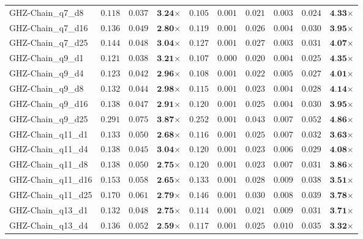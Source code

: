 \begin{table*}[t]
{\begin{tabular}{| l || r r c || r r r r r c |}
GHZ-Chain\_q7\_d8 & $0.118$ & $0.037$ & $\textbf{3.24}$$\times$ & $0.105$ & $0.001$ & $0.021$ & $0.003$ & $0.024$ & $\textbf{4.33}$$\times$ \\
GHZ-Chain\_q7\_d16 & $0.136$ & $0.049$ & $\textbf{2.80}$$\times$ & $0.119$ & $0.001$ & $0.026$ & $0.004$ & $0.030$ & $\textbf{3.95}$$\times$ \\
GHZ-Chain\_q7\_d25 & $0.144$ & $0.048$ & $\textbf{3.04}$$\times$ & $0.127$ & $0.001$ & $0.027$ & $0.003$ & $0.031$ & $\textbf{4.07}$$\times$ \\
GHZ-Chain\_q9\_d1 & $0.121$ & $0.038$ & $\textbf{3.21}$$\times$ & $0.107$ & $0.000$ & $0.020$ & $0.004$ & $0.025$ & $\textbf{4.35}$$\times$ \\
GHZ-Chain\_q9\_d4 & $0.123$ & $0.042$ & $\textbf{2.96}$$\times$ & $0.108$ & $0.001$ & $0.022$ & $0.005$ & $0.027$ & $\textbf{4.01}$$\times$ \\
GHZ-Chain\_q9\_d8 & $0.132$ & $0.044$ & $\textbf{2.98}$$\times$ & $0.115$ & $0.001$ & $0.023$ & $0.004$ & $0.028$ & $\textbf{4.14}$$\times$ \\
GHZ-Chain\_q9\_d16 & $0.138$ & $0.047$ & $\textbf{2.91}$$\times$ & $0.120$ & $0.001$ & $0.025$ & $0.004$ & $0.030$ & $\textbf{3.95}$$\times$ \\
GHZ-Chain\_q9\_d25 & $0.291$ & $0.075$ & $\textbf{3.87}$$\times$ & $0.252$ & $0.001$ & $0.043$ & $0.007$ & $0.052$ & $\textbf{4.86}$$\times$ \\
GHZ-Chain\_q11\_d1 & $0.133$ & $0.050$ & $\textbf{2.68}$$\times$ & $0.116$ & $0.001$ & $0.025$ & $0.007$ & $0.032$ & $\textbf{3.63}$$\times$ \\
GHZ-Chain\_q11\_d4 & $0.138$ & $0.045$ & $\textbf{3.04}$$\times$ & $0.120$ & $0.001$ & $0.023$ & $0.006$ & $0.029$ & $\textbf{4.08}$$\times$ \\
GHZ-Chain\_q11\_d8 & $0.138$ & $0.050$ & $\textbf{2.75}$$\times$ & $0.120$ & $0.001$ & $0.023$ & $0.007$ & $0.031$ & $\textbf{3.86}$$\times$ \\
GHZ-Chain\_q11\_d16 & $0.153$ & $0.058$ & $\textbf{2.65}$$\times$ & $0.133$ & $0.001$ & $0.028$ & $0.009$ & $0.038$ & $\textbf{3.51}$$\times$ \\
GHZ-Chain\_q11\_d25 & $0.170$ & $0.061$ & $\textbf{2.79}$$\times$ & $0.146$ & $0.001$ & $0.030$ & $0.008$ & $0.039$ & $\textbf{3.78}$$\times$ \\
GHZ-Chain\_q13\_d1 & $0.132$ & $0.048$ & $\textbf{2.75}$$\times$ & $0.114$ & $0.001$ & $0.021$ & $0.009$ & $0.031$ & $\textbf{3.71}$$\times$ \\
GHZ-Chain\_q13\_d4 & $0.136$ & $0.052$ & $\textbf{2.59}$$\times$ & $0.117$ & $0.001$ & $0.025$ & $0.010$ & $0.035$ & $\textbf{3.32}$$\times$ \\

\end{tabular}}
\end{table*}

